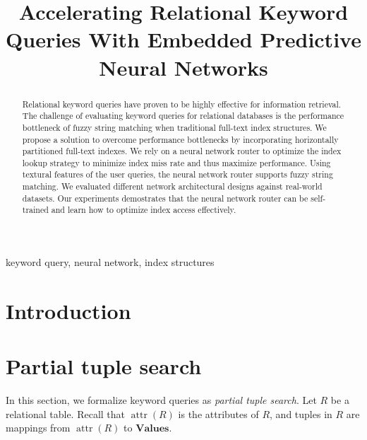 \documentclass[conference]{IEEEtran}
\newcommand{\Attr}{\operatorname{attr}}
\newcommand{\Values}{\mathbf{Values}}
\begin{document}
\title{
Accelerating Relational Keyword Queries With Embedded Predictive Neural Networks
}


\author{
}

\maketitle

\begin{abstract}
Relational keyword queries have proven to be highly effective for
information retrieval.  The challenge of evaluating keyword queries for
relational databases is the performance bottleneck of fuzzy string
matching when traditional full-text index structures.  We propose a
solution to overcome performance bottlenecks by incorporating
horizontally partitioned full-text indexes.  We rely on a neural
network router to optimize the index lookup strategy to minimize index
miss rate and thus maximize performance.  Using textural features of
the user queries, the neural network router supports fuzzy string
matching.  We evaluated different network architectural designs against
real-world datasets.  Our experiments demostrates that the neural
network router can be self-trained and learn how to optimize index
access effectively.
\end{abstract}

\begin{IEEEkeywords}
keyword query, neural network, index structures
\end{IEEEkeywords}

\section{Introduction}


\section{Partial tuple search}
In this section, we formalize keyword queries as {\em partial tuple search}.
Let $R$ be a relational table.  Recall that $\Attr(R)$ is the attributes of $R$, and tuples in $R$ are mappings from $\Attr(R)$ to $\Values$.
\end{document}
